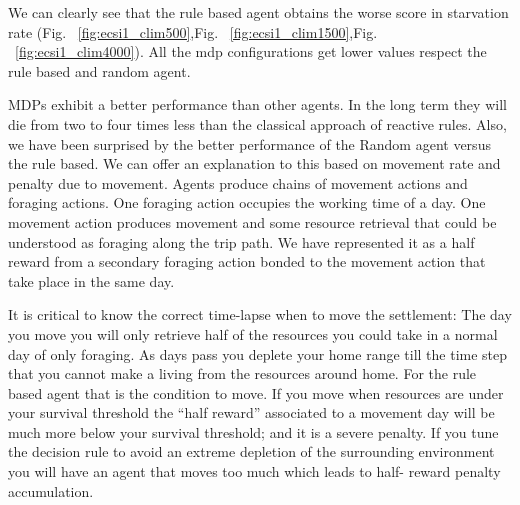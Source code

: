 \documentclass[11pt,oneside,a4paper,openright]{report}
\begin{document}
We can clearly see that the rule based agent obtains the worse score in starvation rate (Fig. ~\ref{fig:ecsi1_clim500},Fig. ~\ref{fig:ecsi1_clim1500},Fig. ~\ref{fig:ecsi1_clim4000}). All the mdp configurations get lower values respect the rule based and random agent.

MDPs exhibit a better performance than other agents. In the long term they will die from two to four times less than the classical approach of reactive rules.
Also, we have been surprised by the better performance of the Random agent versus the rule based. We can offer an explanation to this based on movement rate and penalty due to movement. Agents produce chains of movement actions and foraging actions. 
One foraging action occupies the working time of a day. One movement action produces movement and some resource retrieval that could be understood as foraging along the trip path. We have represented it as a half reward from a secondary foraging action bonded to the movement action that take place in the same day.

It is critical to know the correct time-lapse when to move the settlement: The day you move you will only retrieve half of the resources you could take in a normal day of only foraging. As days pass you deplete your home range till the time step that you cannot make a living from the resources around home. 
For the rule based agent that is the condition to move. If you move when resources are under your survival threshold the “half reward” associated to a movement day will be much more below your survival threshold; and it is a severe penalty. 
If you tune the decision rule to avoid an extreme depletion of the surrounding environment you will have an agent that moves too much which leads to half- reward penalty accumulation.
\end{document}
